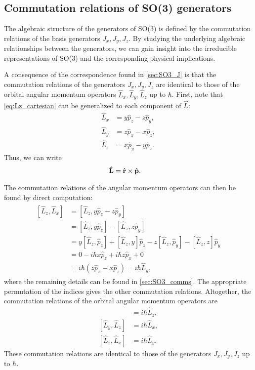 \subsection{Commutation relations of SO(3) generators}\label{sub:SO3_comms}
The algebraic structure of the generators of SO(3) is defined by the commutation relations of the basis generators $J_x,J_y,J_z$. By studying the underlying algebraic relationships between the generators, we can gain insight into the irreducible representations of SO(3) and the corresponding physical implications.

A consequence of the correspondence found in \cref{sec:SO3_J} is that the commutation relations of the generators $J_x,J_y,J_z$ are identical to those of the orbital angular momentum operators $\hat{L}_x,\hat{L}_y,\hat{L}_z$ up to $\hbar$. First, note that \cref{eq:Lz_cartesian} can be generalized to each component of $\vec{L}$:
\begin{align}
    \hat{L}_x &= y \hat{p}_z - z \hat{p}_y, \\
    \hat{L}_y &= z \hat{p}_x - x \hat{p}_z, \\
    \hat{L}_z &= x \hat{p}_y - y \hat{p}_x.
\end{align}
Thus, we can write
\begin{align}
    \mathbf{\hat{L}} &= \mathbf{\hat{r}}\times\mathbf{\hat{p}}.
\end{align}

The commutation relations of the angular momentum operators can then be found by direct computation:
\begin{align}
    \begin{split}        
    [\hat{L}_z,\hat{L}_x]
        &= [\hat{L}_z, y \hat{p}_z-z\hat{p}_y] \\
        &= [\hat{L}_z, y \hat{p}_z] - [\hat{L}_z, z\hat{p}_y] \\
        &= y[\hat{L}_z, \hat{p}_z] + [\hat{L}_z, y]\hat{p}_z - z[\hat{L}_z, \hat{p}_y] - [\hat{L}_z, z]\hat{p}_y \\
        &= 0 - i\hbar x\hat{p}_z + i\hbar z\hat{p}_x + 0 \\
        &= i\hbar(z\hat{p}_x - x\hat{p}_z) = i\hbar\hat{L}_y,
    \end{split}
\end{align}
where the remaining details can be found in \cref{sec:SO3_comms}. The appropriate permutation of the indices gives the other commutation relations. Altogether, the commutation relations of the orbital angular momentum operators are
\begin{align}
    [\hat{L}_x,\hat{L}_y] &= i\hbar\hat{L}_z, \label{eq:comLz} \\
    [\hat{L}_y,\hat{L}_z] &= i\hbar\hat{L}_x, \label{eq:comLx} \\
    [\hat{L}_z,\hat{L}_x] &= i\hbar\hat{L}_y. \label{eq:comLy}
\end{align}
These commutation relations are identical to those of the generators $J_x,J_y,J_z$ up to $\hbar$.

